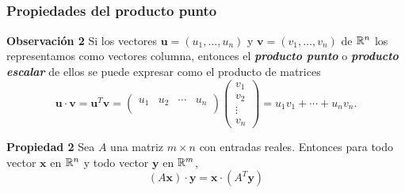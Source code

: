 
\subsection{}

{\nologo 
\begin{frame}\frametitle{Propiedades del producto punto}
	
	\begin{alertblock}{\textbf{Observación 2}}\justifying
		Si los vectores $\mathbf{u}=(u_1,\hdots,u_n) $ y $\mathbf{v}=(v_1,\hdots,v_n)$ de $\mathbb{R}^n$ 
		los representamos como vectores columna, entonces el \textbf{\textit{producto punto}} o \textbf{\textit{producto escalar}} de ellos
		se puede expresar como el producto de matrices
		\[
		\mathbf{u}\cdot \mathbf{v} =
		\mathbf{u}^T \mathbf{v} =
		\left(
		\begin{array}{cccc}
		u_1 & u_2 & \cdots & u_n \\
		\end{array}
		\right) 
		\left(
		\begin{array}{c}
		v_1\\
		v_2\\
		\vdots \\[1mm]
		v_n
		\end{array}
		\right)
		= u_1 v_1 +  \cdots + u_nv_n. 
		\]
	\end{alertblock}
	
	\begin{prop}{\textbf{Propiedad 2}}
		\justifying
		Sea $A$ una matriz $m\times n$ con entradas reales. Entonces para todo vector $\mathbf{x}$ en $\mathbb{R}^n$ y 
		todo vector $\mathbf{y}$ en $\mathbb{R}^m$,
		\[
			\left(A\mathbf{x}\right)\cdot \mathbf{y} = \mathbf{x}\cdot \left(A^T\mathbf{y}\right)
		\]
	\end{prop}	
	
\end{frame}
}


\subsection{}


